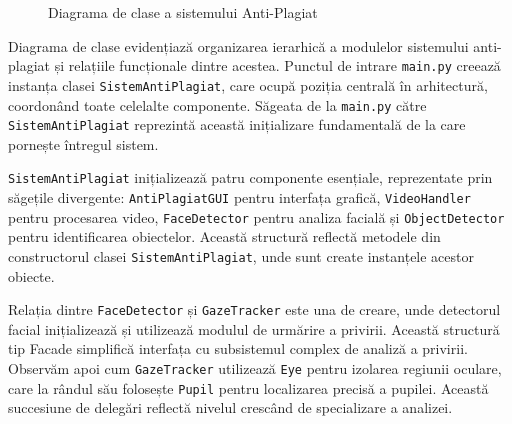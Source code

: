 \documentclass[12pt,a4paper]{article}
\begin{document}
\begin{figure}[H]
    \caption{Diagrama de clase a sistemului Anti-Plagiat}
\end{figure}

Diagrama de clase evidențiază organizarea ierarhică a modulelor sistemului anti-plagiat și relațiile funcționale dintre acestea. Punctul de intrare \texttt{main.py} creează instanța clasei \texttt{SistemAntiPlagiat}, care ocupă poziția centrală în arhitectură, coordonând toate celelalte componente. Săgeata de la \texttt{main.py} către \texttt{SistemAntiPlagiat} reprezintă această inițializare fundamentală de la care pornește întregul sistem.

\texttt{SistemAntiPlagiat} inițializează patru componente esențiale, reprezentate prin săgețile divergente: \texttt{AntiPlagiatGUI} pentru interfața grafică, \texttt{VideoHandler} pentru procesarea video, \texttt{FaceDetector} pentru analiza facială și \texttt{ObjectDetector} pentru identificarea obiectelor. Această structură reflectă metodele din constructorul clasei \texttt{SistemAntiPlagiat}, unde sunt create instanțele acestor obiecte.

Relația dintre \texttt{FaceDetector} și \texttt{GazeTracker} este una de creare, unde detectorul facial inițializează și utilizează modulul de urmărire a privirii. Această structură tip Facade simplifică interfața cu subsistemul complex de analiză a privirii. Observăm apoi cum \texttt{GazeTracker} utilizează \texttt{Eye} pentru izolarea regiunii oculare, care la rândul său folosește \texttt{Pupil} pentru localizarea precisă a pupilei. Această succesiune de delegări reflectă nivelul crescând de specializare a analizei.
\end{document}
